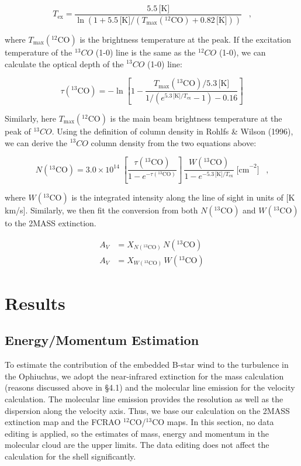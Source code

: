 \documentclass[11pt,a4paper]{emulateapj}
\begin{document}
\begin{equation}
T_{\text{ex}} = \frac{5.5\,\text{[K]}}{\ln{\left(1+5.5\,\text{[K]}/\left(T_{\text{max}}(^{12}\text{CO})+0.82\,\text{[K]}\right)\right)}}\;\;\;\text{,}
\end{equation}

where $T_{\text{max}}(^{12}\text{CO})$ is the brightness temperature at the peak. If the excitation temperature of the $^{13}CO$ (1-0) line is the same as the $^{12}CO$ (1-0), we can calculate the optical depth of the $^{13}CO$ (1-0) line:

\begin{equation}
\tau(^{13}\text{CO}) = - \ln\left[1 - \frac{T_{\text{max}}(^{13}\text{CO})/5.3\,\text{[K]}}{1/\left(e^{5.3\,\text{[K]}/T_{\text{ex}}}-1\right) - 0.16}\right]
\end{equation}

Similarly, here $T_{\text{max}}(^{12}\text{CO})$ is the main beam brightness temperature at the peak of $^{13}CO$. Using the definition of column density in Rohlfs \& Wilson (1996), we can derive the $^{13}CO$ column density from the two equations above:

\begin{equation}
N(^{13}\text{CO}) = 3.0\times10^{14}\;\left[\frac{\tau(^{13}\text{CO})}{1-e^{-\tau(^{13}\text{CO})}}\right]\,\frac{W(^{13}\text{CO})}{1-e^{-5.3\,\text{[K]}/T_{\text{ex}}}}\;\text{[cm}^{-2}\text{]}\;\;\;\text{,}
\end{equation}

where $W(^{13}\text{CO})$ is the integrated intensity along the line of sight in units of [K km/s]. Similarly, we then fit the conversion from both $N(^{13}\text{CO})$ and $W(^{13}\text{CO})$ to the 2MASS extinction.

\begin{equation}
\begin{aligned}
A_V &= X_{N(^{13}\text{CO})}\,N(^{13}\text{CO}) \\
A_V &= X_{W(^{13}\text{CO})}\,W(^{13}\text{CO})
\end{aligned}
\end{equation}


\section{Results}
\label{sec:results}

\subsection{Energy/Momentum Estimation}
To estimate the contribution of the embedded B-star wind to the turbulence in the Ophiuchus, we adopt the near-infrared extinction for the mass calculation (reasons discussed above in \S4.1) and the molecular line emission for the velocity calculation. The molecular line emission provides the resolution as well as the dispersion along the velocity axis. Thus, we base our calculation on the 2MASS extinction map and the FCRAO $^{12}$CO/$^{13}$CO maps. In this section, no data editing is applied, so the estimates of mass, energy and momentum in the molecular cloud are the upper limits. The data editing does not affect the calculation for the shell significantly.
\end{document}
